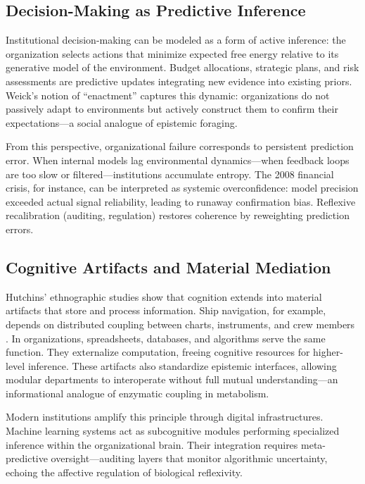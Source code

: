\documentclass[11pt,a4paper]{article}
\begin{document}
\subsection{Decision-Making as Predictive Inference}

Institutional decision-making can be modeled as a form of active inference: the organization selects actions that minimize expected free energy relative to its generative model of the environment.  Budget allocations, strategic plans, and risk assessments are predictive updates integrating new evidence into existing priors.  Weick’s notion of “enactment” \citep{Weick1979SocialPsychOrganization} captures this dynamic: organizations do not passively adapt to environments but actively construct them to confirm their expectations—a social analogue of epistemic foraging.

From this perspective, organizational failure corresponds to persistent prediction error.  When internal models lag environmental dynamics—when feedback loops are too slow or filtered—institutions accumulate entropy.  The 2008 financial crisis, for instance, can be interpreted as systemic overconfidence: model precision exceeded actual signal reliability, leading to runaway confirmation bias.  Reflexive recalibration (auditing, regulation) restores coherence by reweighting prediction errors.

\subsection{Cognitive Artifacts and Material Mediation}

Hutchins’ ethnographic studies show that cognition extends into material artifacts that store and process information.  Ship navigation, for example, depends on distributed coupling between charts, instruments, and crew members \citep{Hutchins1995CognitionInTheWild}.  In organizations, spreadsheets, databases, and algorithms serve the same function.  They externalize computation, freeing cognitive resources for higher-level inference.  These artifacts also standardize epistemic interfaces, allowing modular departments to interoperate without full mutual understanding—an informational analogue of enzymatic coupling in metabolism.

Modern institutions amplify this principle through digital infrastructures.  Machine learning systems act as subcognitive modules performing specialized inference within the organizational brain.  Their integration requires meta-predictive oversight—auditing layers that monitor algorithmic uncertainty, echoing the affective regulation of biological reflexivity.
\end{document}
